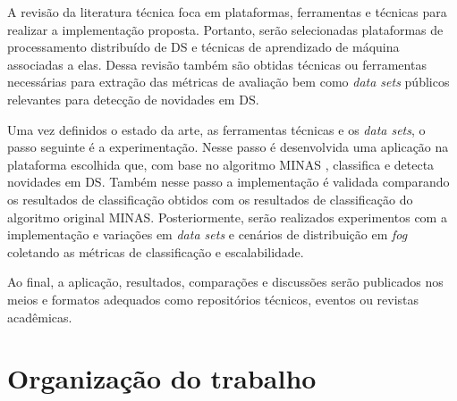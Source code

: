 A revisão da literatura técnica foca em plataformas, ferramentas e técnicas
para realizar a implementação proposta.
Portanto, serão selecionadas plataformas de processamento distribuído de DS
e técnicas de aprendizado de máquina associadas a elas.
Dessa revisão também são obtidas técnicas ou ferramentas necessárias
para extração das métricas de avaliação bem como \emph{data sets}
públicos relevantes para detecção de novidades em DS.

Uma vez definidos o estado da arte, as ferramentas técnicas e os
\emph{data sets}, o passo seguinte é a experimentação.
Nesse passo é desenvolvida uma aplicação na plataforma escolhida que, com base no
algoritmo MINAS \cite{Faria2016minas}, classifica e detecta novidades em DS.
Também nesse passo a implementação é validada comparando os resultados de
classificação obtidos com os resultados de classificação do algoritmo original
MINAS.
Posteriormente, serão realizados experimentos com a implementação e variações em \emph{data sets} e
cenários de distribuição em \emph{fog} coletando as métricas de classificação e escalabilidade.

Ao final, a aplicação, resultados, comparações e discussões serão publicados
nos meios e formatos adequados como repositórios técnicos, eventos ou revistas
acadêmicas.

\section{Organização do trabalho}








